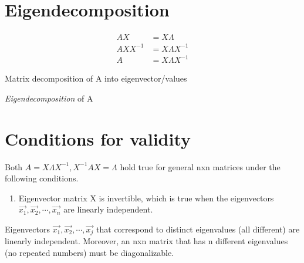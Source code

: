 \documentclass[12pt]{amsart}
\numberwithin{equation}{theorem}    %
\begin{document}
\section{Eigendecomposition}

\begin{align*}
    AX       & = X\Lambda         \\
    AXX^{-1} & = X\Lambda X^{-1}  \\
    A        & = X \Lambda X^{-1}
\end{align*}

Matrix decomposition of A into eigenvector/values

\emph{Eigendecomposition} of A

\section{Conditions for validity}

Both $A=X\Lambda X^{-1}, X^{-1}AX = \Lambda$ hold true for general nxn matrices under the following conditions.

\begin{enumerate}
    \item Eigenvector matrix X is invertible, which is true when the eigenvectors $\vec{x_1}, \vec{x_2}, \cdots , \vec{x_n}$ are linearly independent.
\end{enumerate}

\begin{theorem}
    Eigenvectors $\vec{x_1}, \vec{x_2}, \cdots , \vec{x_j}$ that correspond to distinct eigenvalues (all different) are linearly independent. Moreover, an nxn matrix that has n different eigenvalues (no repeated numbers) must be diagonalizable.
\end{theorem}
\end{document}
